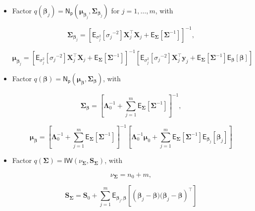 \begin{itemize}
    \item Factor $q(\bm{\beta}_j)=\mathsf{N_p}(\bm{\mu}_{\bm{\beta}_j},\bm{\Sigma}_{\bm{\beta}_j})$  for $j=1,\dots,m$, with

\begin{equation}
\label{HLRM_CAVI_Sigma_Betaj}
\bm{\Sigma}_{\bm{\beta}_j} = \left[ \mathsf{E}_{\sigma^2_j}\left[{\sigma_j}^{-2}\right] \bm{X}_{j}^\top \bm{X}_{j}  + \mathsf{E}_{\bm{\Sigma}}\left[\bm{\Sigma}^{-1}\right]  \right]^{-1},
\end{equation}

\begin{equation}
\label{HLRM_CAVI_Mu_Betaj}
\bm{\mu}_{\bm{\beta}_j}= \left[ \mathsf{E}_{\sigma^2_j}\left[{\sigma_j}^{-2}\right] \bm{X}_{j}^\top \bm{X}_{j}  + \mathsf{E}_{\bm{\Sigma}}\left[\bm{\Sigma}^{-1}\right]  \right]^{-1}\left[\mathsf{E}_{\sigma^2_j}\left[{\sigma_j}^{-2}\right] \bm{X}_{j}^\top \bm{y}_{j} + \mathsf{E}_{\bm{\Sigma}}\left[\bm{\Sigma}^{-1}\right] \mathsf{E}_{\bm{\beta}}\left[\bm{\beta} \right] \right]
\end{equation}

\item Factor $q(\bm{\beta})=\mathsf{N_p}(\bm{\mu}_{\bm{\beta}},\bm{\Sigma}_{\bm{\beta}})$, with

\begin{equation}
\label{HLRM_CAVI_Sigma_Beta}
\bm{\Sigma}_{\bm{\beta}} = \left[\bm{\Lambda}_0^{-1}   + \sum_{j=1}^{m}\mathsf{E}_{\bm{\Sigma}}\left[\bm{\Sigma}^{-1}\right]  \right] ^{-1},
\end{equation}

\begin{equation}
\label{HLRM_CAVI_Mu_Beta}
\bm{\mu}_{\bm{\beta}}= \left[\bm{\Lambda}_0^{-1}   + \sum_{j=1}^{m}\mathsf{E}_{\bm{\Sigma}}\left[\bm{\Sigma}^{-1}\right]  \right]^{-1}\left[\bm{\Lambda}_0^{-1} \bm{\mu}_0 + \sum_{j=1}^{m}\mathsf{E}_{\bm{\Sigma}}\left[\bm{\Sigma}^{-1}\right] \mathsf{E}_{\bm{\beta}_j}\left[\bm{\beta}_j \right]\right]
\end{equation}

    \item Factor $q(\bm{\Sigma})=\mathsf{IW}(\nu_{\bm{\Sigma}},\bm{S}_{\bm{\Sigma}})$, with

\begin{equation}
\label{HLRM_CAVI_nu_Sigma}
\nu_{\bm{\Sigma}} = n_0+m,
\end{equation}

\begin{equation}
\label{HLRM_CAVI_S_Sigma}
\bm{S}_{\bm{\Sigma}}=  \bm{S}_0 + \sum_{j=1}^{m} \mathsf{E}_{\bm{\beta}_j,\bm{\beta}}\left[\left(\bm{\beta}_j - \bm{\beta})(\bm{\beta}_j - \bm{\beta}\right)^\top\right]
\end{equation}
    

\end{itemize}
